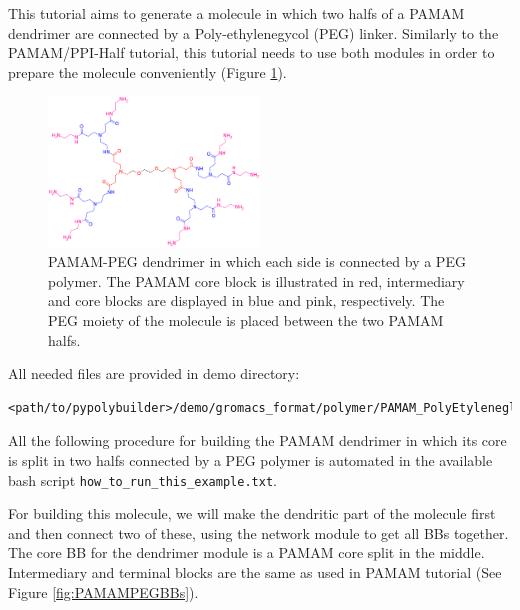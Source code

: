 
This tutorial aims to generate a molecule in which two halfs of a PAMAM dendrimer are connected by a Poly-ethylenegycol (PEG) linker.
Similarly to the PAMAM/PPI-Half tutorial, this tutorial needs to use both modules in order to prepare the molecule conveniently (Figure \ref{fig:PAMAMPEG}).

\begin{figure}
    \centering
    \includegraphics[width=0.5\textwidth]{PAMAM_PEG/PAMAMPEG.png}
    \caption{PAMAM-PEG dendrimer in which each side is connected by a PEG polymer. The PAMAM core block is illustrated in red, intermediary and core blocks are displayed in blue and pink, respectively. The PEG moiety of the molecule is placed between the two PAMAM halfs.}
    \label{fig:PAMAMPEG}
\end{figure}

All needed files are provided in demo directory:

\begin{lstlisting}
<path/to/pypolybuilder>/demo/gromacs_format/polymer/PAMAM_PolyEtyleneglycol
\end{lstlisting}

All the following procedure for building the PAMAM dendrimer in which its core is split in two halfs connected by a PEG polymer is automated in the available bash script \texttt{how\_to\_run\_this\_example.txt}.

For building this molecule, we will make the dendritic part of the molecule first and then connect two of these, using the network module to get all BBs together.
The core BB for the dendrimer module is a PAMAM core split in the middle.
Intermediary and terminal blocks are the same as used in PAMAM tutorial (See Figure \ref{fig:PAMAMPEGBBs}).

